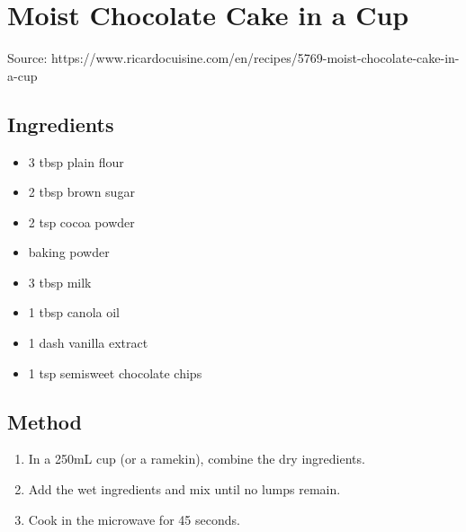 \clearpage
\section{Moist Chocolate Cake in a Cup}


Source: https://www.ricardocuisine.com/en/recipes/5769-moist-chocolate-cake-in-a-cup

\begin{multicols}{2}
    \subsection{Ingredients}
      \begin{itemize}
        \item 3 tbsp plain flour
        \item 2 tbsp brown sugar
        \item 2 tsp cocoa powder
        \item {} baking powder
        \item 3 tbsp milk
        \item 1 tbsp canola oil
        \item 1 dash vanilla extract
        \item 1 tsp semisweet chocolate chips
      \end{itemize}
  \vfill\null
  \columnbreak
  \subsection{Method}
    \begin{enumerate}
      \item In a 250mL cup (or a ramekin), combine the dry ingredients.
      \item Add the wet ingredients and mix until no lumps remain.
      \item Cook in the microwave for 45 seconds.
    \end{enumerate}
  \end{multicols}
